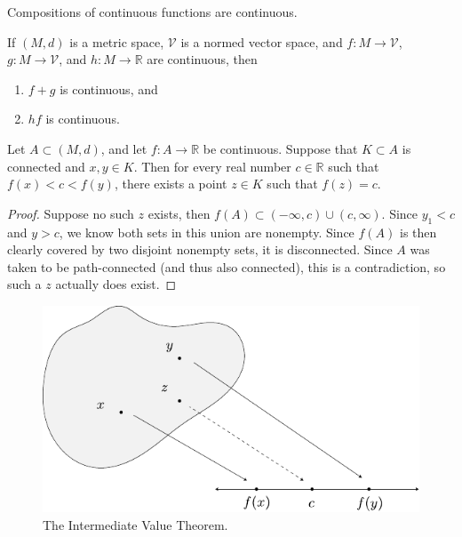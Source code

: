 \documentclass[twoside,10pt]{report}
\begin{document}
\begin{prop}
	Compositions of continuous functions are continuous.
\end{prop}

\begin{prop}
	If $(M,d)$ is a metric space, $\mathcal{V}$ is a normed vector space, and $f:M\to \mathcal{V}$, $g:M\to \mathcal{V}$, and $h:M \to \mathbb{R}$ are continuous, then
	\begin{enumerate}
		\item $f+g$ is continuous, and
		\item $hf$ is continuous.
	\end{enumerate}
\end{prop}

\begin{thrm}
	Let $A \subset (M,d)$, and let $f:A \to \mathbb{R}$ be continuous. Suppose that $K \subset A$ is connected and $x,y \in K$. Then for every real number $c \in \mathbb{R}$ such that $f(x) < c < f(y)$, there exists a point $z \in K$ such that $f(z) = c$.
\end{thrm}
\begin{proof}
	Suppose no such $z$ exists, then $f(A) \subset (-\infty,c) \cup (c, \infty)$. Since $y_1 < c$ and $y > c$, we know both sets in this union are nonempty. Since $f(A)$ is then clearly covered by two disjoint nonempty sets, it is disconnected. Since $A$ was taken to be path-connected (and thus also connected), this is a contradiction, so such a $z$ actually does exist.
\end{proof}

\begin{figure}[H]
	\centering
	\includegraphics[scale=0.8]{fig/intermediate-value.pdf}
	\caption{The Intermediate Value Theorem.}
\end{figure}
\end{document}
